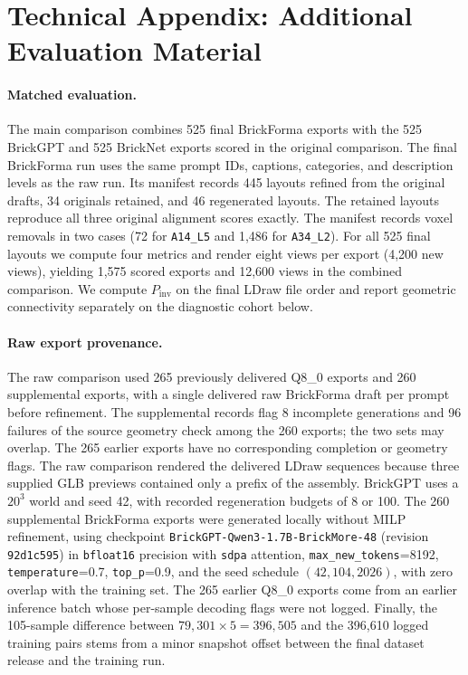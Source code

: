 \section{Technical Appendix: Additional Evaluation Material}
\label{app:eval}

\paragraph{Matched evaluation.}
The main comparison combines 525 final BrickForma exports with the 525 BrickGPT and 525 BrickNet exports scored in the original comparison. The final BrickForma run uses the same prompt IDs, captions, categories, and description levels as the raw run. Its manifest records 445 layouts refined from the original drafts, 34 originals retained, and 46 regenerated layouts. The retained layouts reproduce all three original alignment scores exactly. The manifest records voxel removals in two cases (72 for \texttt{A14\_L5} and 1,486 for \texttt{A34\_L2}). For all 525 final layouts we compute four metrics and render eight views per export (4,200 new views), yielding 1,575 scored exports and 12,600 views in the combined comparison. We compute $P_{\mathrm{inv}}$ on the final LDraw file order and report geometric connectivity separately on the diagnostic cohort below.

\paragraph{Raw export provenance.}
The raw comparison used 265 previously delivered Q8\_0 exports and 260 supplemental exports, with a single delivered raw BrickForma draft per prompt before refinement. The supplemental records flag 8 incomplete generations and 96 failures of the source geometry check among the 260 exports; the two sets may overlap. The 265 earlier exports have no corresponding completion or geometry flags. The raw comparison rendered the delivered LDraw sequences because three supplied GLB previews contained only a prefix of the assembly. BrickGPT uses a $20^3$ world and seed 42, with recorded regeneration budgets of 8 or 100. The 260 supplemental BrickForma exports were generated locally without MILP refinement, using checkpoint \texttt{BrickGPT-Qwen3-1.7B-BrickMore-48} (revision \texttt{92d1c595}) in \texttt{bfloat16} precision with \texttt{sdpa} attention, \texttt{max\_new\_tokens}=8192, \texttt{temperature}=0.7, \texttt{top\_p}=0.9, and the seed schedule $(42,104,2026)$, with zero overlap with the training set. The 265 earlier Q8\_0 exports come from an earlier inference batch whose per-sample decoding flags were not logged. Finally, the 105-sample difference between $79{,}301{\times}5=396{,}505$ and the 396,610 logged training pairs stems from a minor snapshot offset between the final dataset release and the training run.


